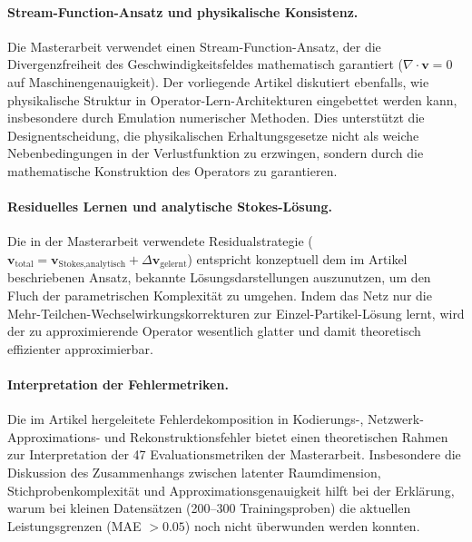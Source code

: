 \documentclass[a4paper,12pt]{article}
\begin{document}
\paragraph{Stream-Function-Ansatz und physikalische Konsistenz.}
Die Masterarbeit verwendet einen Stream-Function-Ansatz, der die Divergenzfreiheit des Geschwindigkeitsfeldes mathematisch garantiert ($\nabla \cdot \mathbf{v} = 0$ auf Maschinengenauigkeit). Der vorliegende Artikel diskutiert ebenfalls, wie physikalische Struktur in Operator-Lern-Architekturen eingebettet werden kann, insbesondere durch Emulation numerischer Methoden. Dies unterstützt die Designentscheidung, die physikalischen Erhaltungsgesetze nicht als weiche Nebenbedingungen in der Verlustfunktion zu erzwingen, sondern durch die mathematische Konstruktion des Operators zu garantieren.

\paragraph{Residuelles Lernen und analytische Stokes-Lösung.}
Die in der Masterarbeit verwendete Residualstrategie ($\mathbf{v}_\text{total} = \mathbf{v}_\text{Stokes,analytisch} + \Delta\mathbf{v}_\text{gelernt}$) entspricht konzeptuell dem im Artikel beschriebenen Ansatz, bekannte Lösungsdarstellungen auszunutzen, um den Fluch der parametrischen Komplexität zu umgehen. Indem das Netz nur die Mehr-Teilchen-Wechselwirkungskorrekturen zur Einzel-Partikel-Lösung lernt, wird der zu approximierende Operator wesentlich glatter und damit theoretisch effizienter approximierbar.

\paragraph{Interpretation der Fehlermetriken.}
Die im Artikel hergeleitete Fehlerdekomposition in Kodierungs-, Netzwerk-Approximations- und Rekonstruktionsfehler bietet einen theoretischen Rahmen zur Interpretation der 47 Evaluationsmetriken der Masterarbeit. Insbesondere die Diskussion des Zusammenhangs zwischen latenter Raumdimension, Stichprobenkomplexität und Approximationsgenauigkeit hilft bei der Erklärung, warum bei kleinen Datensätzen (200--300 Trainingsproben) die aktuellen Leistungsgrenzen (MAE $> 0.05$) noch nicht überwunden werden konnten.
\end{document}
